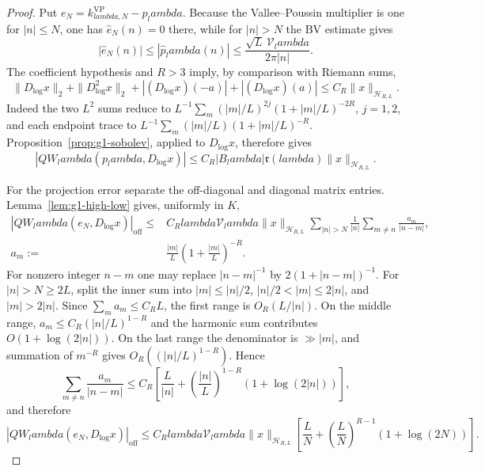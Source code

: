 \documentclass[11pt]{article}
\def\lambda{lambda}%
\theoremstyle{remark}
\begin{document}
\begin{proof}
Put $e_N=k^{\mathrm{VP}}_{\lambda,N}-p_\lambda$.  Because the
Vallee--Poussin multiplier is one for $|n|\le N$, one has
$\widehat e_N(n)=0$ there, while for $|n|>N$ the BV estimate gives
\[
 |\widehat e_N(n)|
 \le |\widehat p_\lambda(n)|
 \le \frac{\sqrt L\,\mathcal V_\lambda}{2\pi|n|}.
\]
The coefficient hypothesis and $R>3$ imply, by comparison with Riemann sums,
\[
 \|D_{\log}x\|_2+\|D_{\log}^2x\|_2
 +|(D_{\log}x)(-a)|+|(D_{\log}x)(a)|
 \le C_R\|x\|_{\mathcal H_{R,L}}.
\]
Indeed the two $L^2$ sums reduce to
$L^{-1}\sum_m (|m|/L)^{2j}(1+|m|/L)^{-2R}$, $j=1,2$, and each endpoint
trace to $L^{-1}\sum_m (|m|/L)(1+|m|/L)^{-R}$.
Proposition~\ref{prop:g1-sobolev}, applied to $D_{\log}x$, therefore gives
\[
 |QW_\lambda(p_\lambda,D_{\log}x)|
 \le C_R|B_\lambda|\mathfrak r(\lambda)
       \|x\|_{\mathcal H_{R,L}}.
\]

For the projection error separate the off-diagonal and diagonal matrix
entries.  Lemma~\ref{lem:g1-high-low} gives, uniformly in $K$,
\[
 \begin{split}
 |QW_\lambda(e_N,D_{\log}x)|_{\mathrm{off}}
 \le{}& C_R\lambda\mathcal V_\lambda
 \|x\|_{\mathcal H_{R,L}}
 \sum_{|n|>N}\frac1{|n|}
 \sum_{m\ne n}\frac{a_m}{|n-m|},\\
 a_m:={}&\frac{|m|}{L}
       \left(1+\frac{|m|}{L}\right)^{-R}.
 \end{split}
\]
For nonzero integer $n-m$ one may replace $|n-m|^{-1}$ by
$2(1+|n-m|)^{-1}$.  For $|n|>N\ge2L$, split the inner sum into
$|m|\le|n|/2$, $|n|/2<|m|\le2|n|$, and $|m|>2|n|$.
Since $\sum_m a_m\le C_RL$, the first range is $O_R(L/|n|)$.
On the middle range,
$a_m\le C_R(|n|/L)^{1-R}$ and the harmonic sum contributes
$O(1+\log(2|n|))$.  On the last range the denominator is $\gg|m|$, and
summation of $m^{-R}$ gives $O_R((|n|/L)^{1-R})$.  Hence
\[
 \sum_{m\ne n}\frac{a_m}{|n-m|}
 \le C_R\left[
 \frac{L}{|n|}
 +\left(\frac{|n|}{L}\right)^{1-R}
  (1+\log(2|n|))\right],
\]
and therefore
\begin{equation}\label{eq:g1-weighted-offdiag}
 |QW_\lambda(e_N,D_{\log}x)|_{\mathrm{off}}
 \le C_R\lambda\mathcal V_\lambda\|x\|_{\mathcal H_{R,L}}
 \left[
 \frac{L}{N}
 +\left(\frac{L}{N}\right)^{R-1}(1+\log(2N))\right].
\end{equation}


\end{proof}
\end{document}
